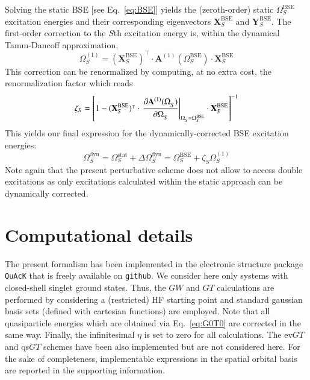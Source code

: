 \documentclass[aip,jcp,reprint,noshowkeys,superscriptaddress]{revtex4-1}
\newcommand{\T}[1]{#1^{\intercal}}
\newcommand{\BSE}{\text{BSE}}
\newcommand{\Om}[2]{\Omega_{#1}^{#2}}
\newcommand{\bA}[2]{\mathbf{A}_{#1}^{#2}}
\newcommand{\bX}[2]{\mathbf{X}_{#1}^{#2}}
\newcommand{\bY}[2]{\mathbf{Y}_{#1}^{#2}}
\begin{document}
Solving the static BSE [see Eq.~\eqref{eq:BSE}] yields the (zeroth-order) static $\Om{S}{\BSE}$ excitation energies and their corresponding eigenvectors $\bX{S}{\BSE}$ and $\bY{S}{\BSE}$. 
The first-order correction to the $S$th excitation energy is, within the dynamical Tamm-Dancoff approximation,
\begin{equation}
\label{eq:Om1-TDA}
	\Om{S}{(1)} = \T{(\bX{S}{\BSE})} \cdot \bA{}{(1)}(\Om{S}{\BSE}) \cdot \bX{S}{\BSE}
\end{equation}
This correction can be renormalized by computing, at no extra cost, the renormalization factor which reads
\begin{equation}
\label{eq:Z}
	\zeta_{S} = \qty[ 1 - \T{(\bX{S}{\BSE})} \cdot \left. \pdv{\bA{}{(1)}(\Om{S}{})}{\Om{S}{}} \right|_{\Om{S}{} = \Om{S}{\BSE}} \cdot \bX{S}{\BSE} ]^{-1}
\end{equation}
This yields our final expression for the dynamically-corrected BSE excitation energies:
\begin{equation}
	\Om{S}{\text{dyn}} = \Om{S}{\text{stat}} + \Delta\Om{S}{\text{dyn}} = \Om{S}{\BSE} + \zeta_{S} \Om{S}{(1)}
\end{equation}
Note again that the present perturbative scheme does not allow to access double excitations as only excitations calculated within the static approach can be dynamically corrected.

\section{Computational details}
\label{sec:compdet}
The present formalism has been implemented in the electronic structure package \texttt{QuAcK} \cite{QuAcK} that is freely available on \texttt{github}. 
We consider here only systems with closed-shell singlet ground states. 
Thus, the $GW$ and $GT$ calculations are performed by considering a (restricted) HF starting point and standard gaussian basis sets (defined with cartesian functions) are employed.
Note that all quasiparticle energies which are obtained via Eq.~\eqref{eq:G0T0} are corrected in the same way.
Finally, the infinitesimal $\eta$ is set to zero for all calculations.
The ev$GT$ and qs$GT$ schemes have been also implemented but are not considered here.
For the sake of completeness, implementable expressions in the spatial orbital basis are reported in the supporting information.
\end{document}
